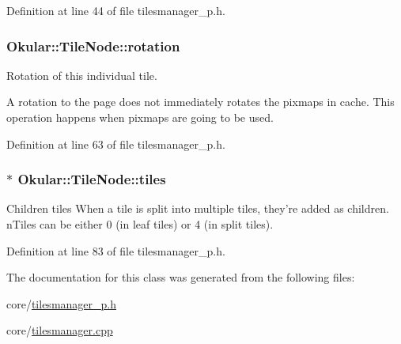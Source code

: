 Definition at line 44 of file tilesmanager\+\_\+p.\+h.

\hypertarget{classOkular_1_1TileNode_a42e2fd93c34cc3a9bedaf23f0448e40f}{
\subsubsection[{rotation}]{ Okular\+::\+Tile\+Node\+::rotation}}\label{classOkular_1_1TileNode_a42e2fd93c34cc3a9bedaf23f0448e40f}
Rotation of this individual tile.

A rotation to the page does not immediately rotates the pixmaps in cache. This operation happens when pixmaps are going to be used. 

Definition at line 63 of file tilesmanager\+\_\+p.\+h.

\hypertarget{classOkular_1_1TileNode_a5b2ae780071fcc4d535e69cd50ea5f4f}{
\subsubsection[{tiles}]{$\ast$ Okular\+::\+Tile\+Node\+::tiles}}\label{classOkular_1_1TileNode_a5b2ae780071fcc4d535e69cd50ea5f4f}
Children tiles When a tile is split into multiple tiles, they're added as children. n\+Tiles can be either 0 (in leaf tiles) or 4 (in split tiles). 

Definition at line 83 of file tilesmanager\+\_\+p.\+h.



The documentation for this class was generated from the following files\+:\begin{DoxyCompactItemize}
\item 
core/\hyperlink{tilesmanager__p_8h}{tilesmanager\+\_\+p.\+h}\item 
core/\hyperlink{tilesmanager_8cpp}{tilesmanager.\+cpp}\end{DoxyCompactItemize}
